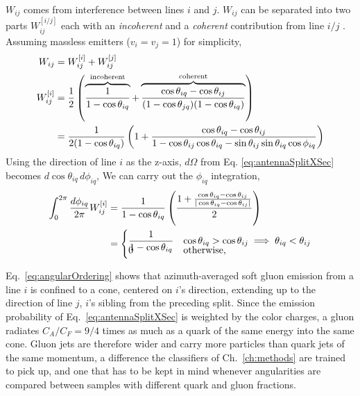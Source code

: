   \(W_{ij}\) comes from interference between lines \(i\) and \(j\). \(W_{ij}\) can be separated into two parts  \(W^{[i/j]}_{ij}\) each with an \emph{incoherent} and a \emph{coherent} contribution from line \(i/j\)  . Assuming massless emitters (\(v_i=v_j=1\)) for simplicity,
\begin{align}
	W_{ij} &= W^{[i]}_{ij} + W^{[j]}_{ij}\notag\\
	W^{[i]}_{ij} &= \frac{1}{2}\left(\overbrace{\frac{1}{1-\cos\theta_{iq}}}^\mathrm{incoherent} + \overbrace{\frac{\cos\theta_{iq}-\cos\theta_{ij}}{(1-\cos\theta_{jq}) (1-\cos\theta_{iq})}}^\mathrm{coherent}\right)\notag\\
	&=  \frac{1}{2(1-\cos\theta_{iq})}\left(1 + \frac{\cos\theta_{iq}-\cos\theta_{ij}}{1-\cos\theta_{ij}\cos\theta_{iq} - \sin\theta_{ij}\sin\theta_{iq}\cos\phi_{iq}}\right)
	\label{eq:antennaSplit}
\end{align}
Using the direction of line \(i\) as the z-axis, \(d\Omega \)  from Eq. \ref{eq:antennaSplitXSec} becomes \(d\cos\theta_{iq}\,d\phi_{iq}\), We can carry out the \(\phi_{iq}\) integration,
\begin{align}
	\int_0^{2\pi}\frac{d\phi_{iq}}{2\pi}W^{[i]}_{ij} &= \frac{1}{1-\cos\theta_{iq}}\left(\frac{1 + \frac{\cos\theta_{iq}-\cos\theta_{ij}}{|\cos\theta_{iq}-\cos\theta_{ij}|}}{2}\right) \notag\\
	&= \begin{cases}
		\dfrac{1}{1-\cos\theta_{iq}} & \cos\theta_{iq} > \cos\theta_{ij} \implies \theta_{iq} < \theta_{ij}\\[-10pt]
		0 & \text{otherwise,}
	\end{cases}
	\label{eq:angularOrdering}
\end{align}

Eq.~\ref{eq:angularOrdering}  shows that azimuth-averaged soft gluon emission from a line \(i\) is confined to a cone, centered on \(i\)'s direction, extending up to the direction of line \(j\), \(i\)'s sibling from the preceding split. 
%
Since the emission probability of Eq.~\ref{eq:antennaSplitXSec} is weighted by the color charges, a gluon radiates \(C_A/C_F = 9/4\) times as much as a quark of the same energy into the same cone.
%
Gluon jets are therefore wider and carry more particles than quark jets of the same momentum, a difference the classifiers of Ch.~\ref{ch:methods} are trained to pick up, and one that has to be kept in mind whenever angularities are compared between samples with different quark and gluon fractions.

